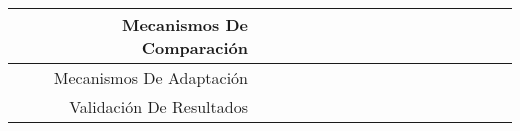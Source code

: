 \documentclass[12pt]{article}
\begin{document}
\begin{table}[H]
{\begin{tabular}{|rllllllllllllllll|}
			\multicolumn{1}{|r|}{Mecanismos De Comparación}                    & \multicolumn{1}{l|}{}                          & \multicolumn{1}{l|}{}                          & \multicolumn{1}{l|}{}                          & \multicolumn{1}{l|}{}                          & \multicolumn{1}{l|}{}                          & \multicolumn{1}{l|}{}                          & \multicolumn{1}{l|}{\cellcolor[HTML]{9FC5E8}}  & \multicolumn{1}{l|}{\cellcolor[HTML]{9FC5E8}}  & \multicolumn{1}{c|}{\cellcolor[HTML]{B4A7D6}}  & \multicolumn{1}{c|}{\cellcolor[HTML]{B4A7D6}}   & \multicolumn{1}{l|}{}                           & \multicolumn{1}{l|}{}                           & \multicolumn{1}{l|}{}                           & \multicolumn{1}{l|}{}                           & \multicolumn{1}{l|}{}                           &                                                 \\ \hline
			\multicolumn{1}{|r|}{Mecanismos De Adaptación}                     & \multicolumn{1}{l|}{}                          & \multicolumn{1}{l|}{}                          & \multicolumn{1}{l|}{}                          & \multicolumn{1}{l|}{}                          & \multicolumn{1}{l|}{}                          & \multicolumn{1}{l|}{}                          & \multicolumn{1}{l|}{}                          & \multicolumn{1}{l|}{}                          & \multicolumn{1}{l|}{}                          & \multicolumn{1}{c|}{\cellcolor[HTML]{B4A7D6}}   & \multicolumn{1}{c|}{\cellcolor[HTML]{B4A7D6}}   & \multicolumn{1}{c|}{\cellcolor[HTML]{B4A7D6}}   & \multicolumn{1}{c|}{\cellcolor[HTML]{EA9999}}   & \multicolumn{1}{l|}{}                           & \multicolumn{1}{l|}{}                           &                                                 \\ \hline
			\multicolumn{1}{|r|}{Validación De Resultados}                     & \multicolumn{1}{l|}{}                          & \multicolumn{1}{l|}{}                          & \multicolumn{1}{l|}{}                          & \multicolumn{1}{l|}{}                          & \multicolumn{1}{l|}{}                          & \multicolumn{1}{l|}{}                          & \multicolumn{1}{l|}{}                          & \multicolumn{1}{l|}{}                          & \multicolumn{1}{l|}{}                          & \multicolumn{1}{l|}{}                           & \multicolumn{1}{l|}{}                           & \multicolumn{1}{c|}{\cellcolor[HTML]{B4A7D6}}   & \multicolumn{1}{c|}{\cellcolor[HTML]{EA9999}}   & \multicolumn{1}{c|}{\cellcolor[HTML]{EA9999}}   & \multicolumn{1}{c|}{\cellcolor[HTML]{EA9999}}   & \multicolumn{1}{c|}{\cellcolor[HTML]{EA9999}}   \\ \hline

\end{tabular}}
\end{table}
\end{document}
